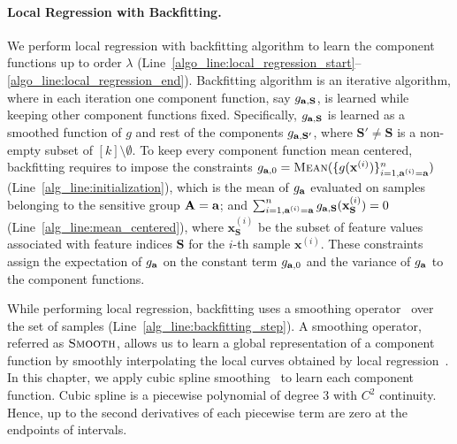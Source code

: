 \paragraph{Local Regression with Backfitting.} We perform local regression with backfitting algorithm to learn the component functions up to order $ \lambda $ (Line~\ref{algo_line:local_regression_start}--\ref{algo_line:local_regression_end}). Backfitting algorithm is an iterative algorithm, where in each iteration one component function, say $ g_{\mathbf{a}, \mathbf{S}} $, is learned while keeping other component functions fixed. Specifically, $ g_{\mathbf{a}, \mathbf{S}} $ is learned as a smoothed function of $ g $ and rest of the components $ g_{\mathbf{a}, \mathbf{S}'} $, where $ \mathbf{S}' \ne \mathbf{S} $ is a non-empty subset of $ [k]\setminus \emptyset $. To keep every component function mean centered, backfitting requires to impose the constraints $ g_{\mathbf{a}, 0} = \textsc{Mean}(\{g(\mathbf{x}^{(i)})\}_{i=1, \mathbf{a}^{(i)} = \mathbf{a}}^n) $ (Line~\ref{alg_line:initialization}), which is the mean of $ g_{\mathbf{a}} $ evaluated on samples belonging to the sensitive group $ \mathbf{A} = \mathbf{a} $;  and $ \sum_{i=1, \mathbf{a}^{(i)} = \mathbf{a}}^ng_{\mathbf{a}, \mathbf{S}}(\mathbf{x}_{\mathbf{S}}^{(i)}) = 0$ (Line~\ref{alg_line:mean_centered}), where $ \mathbf{x}_{\mathbf{S}}^{(i)} $ be the subset of feature values associated with feature indices $ \mathbf{S} $ for the $ i $-th sample $ \mathbf{x}^{(i)} $. These constraints assign the expectation of $ g_{\mathbf{a}} $ on the constant term $ g_{\mathbf{a}, 0} $ and the variance of $ g_{\mathbf{a}} $ to the component functions.                                       


While performing local regression, backfitting uses a smoothing operator~\cite{loader2012smoothing} over the set of samples (Line~\ref{alg_line:backfitting_step}). A smoothing operator, referred as $ \textsc{Smooth} $, allows us to learn a global representation of a component function by smoothly interpolating the local curves obtained by local regression~\cite{loader2012smoothing}. In this chapter, we apply cubic spline smoothing~\cite{li2010global} to learn each component function. Cubic spline is a piecewise polynomial of degree $ 3 $ with $ C^2 $ continuity. Hence, up to the second derivatives of each piecewise term are zero at the endpoints of intervals. 


